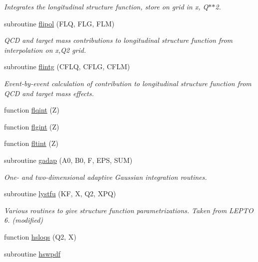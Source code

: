 \begin{DoxyCompactItemize}
\begin{DoxyCompactList}\small\item\em Integrates the longitudinal structure function, store on grid in x, Q$\ast$$\ast$2. \end{DoxyCompactList}\item 
subroutine \hyperlink{djangoh__h_8f_a0226d8583377f82616c48b44ef284119}{flipol} (F\+LQ, F\+LG, F\+LM)
\begin{DoxyCompactList}\small\item\em Q\+CD and target mass contributions to longitudinal structure function from interpolation on x,Q2 grid. \end{DoxyCompactList}\item 
subroutine \hyperlink{djangoh__h_8f_a6de15161311de51e36c1b5198994fdeb}{flintg} (C\+F\+LQ, C\+F\+LG, C\+F\+LM)
\begin{DoxyCompactList}\small\item\em Event-\/by-\/event calculation of contribution to longitudinal structure function from Q\+CD and target mass effects. \end{DoxyCompactList}\item 
function \hyperlink{djangoh__h_8f_a3c1cd7a5e1771b2b02f7c1dac1a0e13a}{flqint} (Z)
\item 
function \hyperlink{djangoh__h_8f_a812f71f71628752f444572335a346609}{flgint} (Z)
\item 
function \hyperlink{djangoh__h_8f_a9d7a0e00e9790a84c69fc6e1725267b3}{fltint} (Z)
\item 
subroutine \hyperlink{djangoh__h_8f_ac99ed93f4fc7c7fd1592d1dd4f744888}{gadap} (A0, B0, F, E\+PS, S\+UM)
\begin{DoxyCompactList}\small\item\em One-\/ and two-\/dimensional adaptive Gaussian integration routines. \end{DoxyCompactList}\item 
subroutine \hyperlink{djangoh__h_8f_aa9010701221260844673a27f5bbae3b7}{lystfu} (KF, X, Q2, X\+PQ)
\begin{DoxyCompactList}\small\item\em Various routines to give structure function parametrizations. Taken from L\+E\+P\+TO 6. (modified) \end{DoxyCompactList}\item 
function \hyperlink{djangoh__h_8f_a60a33b63a3b4ec4bdfaf4a68935b607d}{hsloqs} (Q2, X)
\item 
subroutine \hyperlink{djangoh__h_8f_af5d882064b00cca058771df413ce65d5}{hswpdf}

\end{DoxyCompactItemize}
